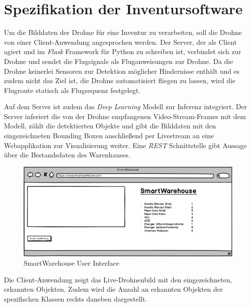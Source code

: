 \section{Spezifikation der Inventursoftware} \label{software}

Um die Bilddaten der Drohne für eine Inventur zu verarbeiten, soll die Drohne von einer Client-Anwendung angesprochen werden. Der Server, der als Client agiert und im \textit{Flask} Framework für Python zu schreiben ist, verbindet sich zur Drohne und sendet die Flugsignale als Fluganweisungen zur Drohne. Da die Drohne keinerlei Sensoren zur Detektion möglicher Hindernisse enthält und es zudem nicht das Ziel ist, die Drohne automatisiert fliegen zu lassen, wird die Flugroute statisch als Flugsequenz festgelegt. 

Auf dem Server ist zudem das \textit{Deep Learning} Modell zur Inferenz integriert. Der Server inferiert die von der Drohne empfangenen Video-Stream-Frames mit dem Modell, zählt die detektierten Objekte und gibt die Bilddaten mit den eingezeichneten Bounding Boxen anschließend per Livestream an eine Webapplikation zur Visualisierung weiter. Eine \textit{REST} Schnittstelle gibt Aussage über die Bestandsdaten des Warenhauses.

\begin{figure}[ht]
	\begin{center}
		\includegraphics[width=15cm]{Bilder/UI.png} 
		\caption[SmartWarehouse User Interface]{SmartWarehouse User Interface}
		\label{ui}
	\end{center}
\end{figure}

Die Client-Anwendung zeigt das Live-Drohnenbild mit den eingezeichneten, erkannten Objekten. Zudem wird die Anzahl an erkannten Objekten der spezifischen Klassen rechts daneben dargestellt. 
